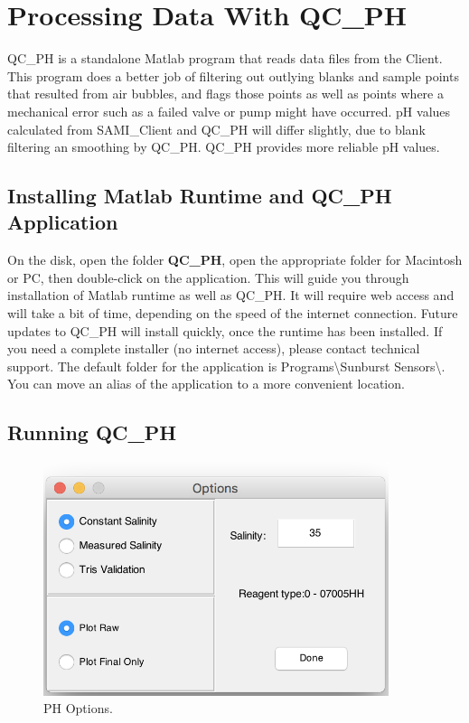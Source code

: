 \section{Processing Data With QC\_PH}
\label{sec:QC_PH}

QC\_PH is a standalone Matlab program that reads data files from the \instType{} Client. This program does a better job of filtering out outlying blanks and sample points that resulted from air bubbles, and flags those points as well as points where a mechanical error such as a failed valve or pump might have occurred. pH values calculated from SAMI\_Client and QC\_PH will differ slightly, due to blank filtering an smoothing by QC\_PH.  QC\_PH provides more reliable pH values.

\subsection{Installing Matlab Runtime and QC\_PH Application}

On the \instType{} disk, open the folder \textbf{QC\_PH}, open the appropriate folder for Macintosh or PC, then double-click on the application.  This will guide you through installation of Matlab runtime as well as QC\_PH.  It will require web access and will take a bit of time, depending on the speed of the internet connection.  Future updates to QC\_PH will install quickly, once the runtime has been installed.  If you need a complete installer (no internet access), please contact technical support. The default folder for the application is Programs\textbackslash Sunburst Sensors\textbackslash. You can move an alias of the application to a more convenient location.  

\subsection{Running QC\_PH}
\label{sec:RunQC_PH}

\begin{figure}
\centering
\includegraphics[width=0.9\textwidth]{figs/PH_Options.png}
\caption{PH Options.}
\label{fig:Options}
\end{figure}

